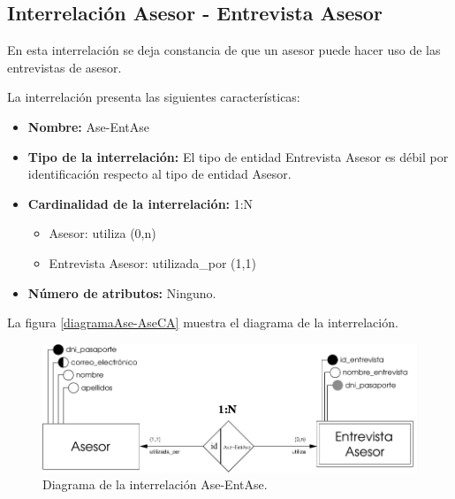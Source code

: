 \subsection{Interrelación Asesor - Entrevista Asesor}

   \begin{description}
      \item[Definición] En esta interrelación se deja constancia de que un
      asesor puede hacer uso de las entrevistas de asesor.

      \item[Características] La interrelación presenta las siguientes
                             características:

         \begin{itemize}
            \item \textbf{Nombre:} Ase-EntAse
            \item \textbf{Tipo de la interrelación:} El tipo de entidad
                  Entrevista Asesor es débil por identificación respecto al
                  tipo de entidad Asesor.
            \item \textbf{Cardinalidad de la interrelación:} 1:N
                  \begin{itemize}
                     \item Asesor: utiliza (0,n)
                     \item Entrevista Asesor: utilizada\_por (1,1)
                  \end{itemize}
            \item \textbf{Número de atributos:} Ninguno.
         \end{itemize}

      \item[Diagrama] La figura \ref{diagramaAse-AseCA} muestra el diagrama de la
                      interrelación.

      \item \begin{figure}[!ht]
            \begin{center}
            \includegraphics[]{07.Modelo_Entidad-Interrelacion/7.3.Analisis_Interrelaciones/diagramas/Ase-EntAse.pdf}
            \caption{Diagrama de la interrelación Ase-EntAse.}
            \label{diagramaAse-EntAse}
            \end{center}
         \end{figure}


\end{description}

